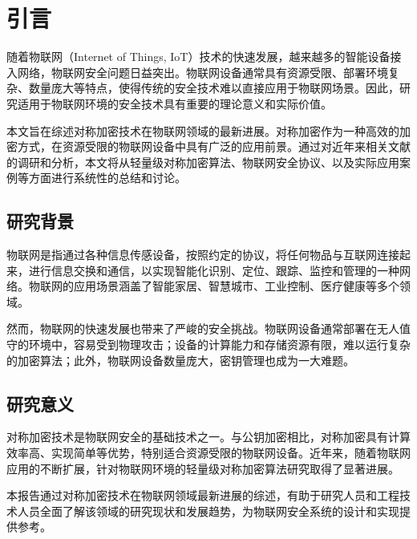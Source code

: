 \chapter{引言}

随着物联网（Internet of Things, IoT）技术的快速发展，越来越多的智能设备接入网络，物联网安全问题日益突出。物联网设备通常具有资源受限、部署环境复杂、数量庞大等特点，使得传统的安全技术难以直接应用于物联网场景。因此，研究适用于物联网环境的安全技术具有重要的理论意义和实际价值。

本文旨在综述对称加密技术在物联网领域的最新进展。对称加密作为一种高效的加密方式，在资源受限的物联网设备中具有广泛的应用前景。通过对近年来相关文献的调研和分析，本文将从轻量级对称加密算法、物联网安全协议、以及实际应用案例等方面进行系统性的总结和讨论。

\section{研究背景}

物联网是指通过各种信息传感设备，按照约定的协议，将任何物品与互联网连接起来，进行信息交换和通信，以实现智能化识别、定位、跟踪、监控和管理的一种网络。物联网的应用场景涵盖了智能家居、智慧城市、工业控制、医疗健康等多个领域。

然而，物联网的快速发展也带来了严峻的安全挑战。物联网设备通常部署在无人值守的环境中，容易受到物理攻击；设备的计算能力和存储资源有限，难以运行复杂的加密算法；此外，物联网设备数量庞大，密钥管理也成为一大难题。

\section{研究意义}

对称加密技术是物联网安全的基础技术之一。与公钥加密相比，对称加密具有计算效率高、实现简单等优势，特别适合资源受限的物联网设备。近年来，随着物联网应用的不断扩展，针对物联网环境的轻量级对称加密算法研究取得了显著进展。

本报告通过对称加密技术在物联网领域最新进展的综述，有助于研究人员和工程技术人员全面了解该领域的研究现状和发展趋势，为物联网安全系统的设计和实现提供参考。
